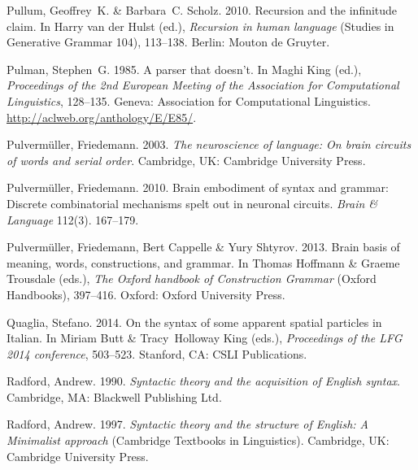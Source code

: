 \begin{thebibliography}{1420}
Pullum, Geoffrey~K. \& Barbara~C. Scholz. 2010.
\newblock Recursion and the infinitude claim.
\newblock In Harry {van der Hulst} (ed.), \emph{Recursion in human language}
  (Studies in Generative Grammar 104), 113--138. Berlin: Mouton de Gruyter.

Pulman, Stephen~G. 1985.
\newblock A parser that doesn't.
\newblock In Maghi King (ed.), \emph{Proceedings of the 2nd {European Meeting
  of the Association for Computational Linguistics}}, 128--135. Geneva:
  Association for Computational Linguistics.
\newblock \urlprefix\url{http://aclweb.org/anthology/E/E85/}.

Pulverm{\"u}ller, Friedemann. 2003.
\newblock \emph{The neuroscience of language: {On} brain circuits of words and
  serial order}.
\newblock Cambridge, UK: Cambridge University Press.

Pulverm{\"u}ller, Friedemann. 2010.
\newblock Brain embodiment of syntax and grammar: Discrete combinatorial
  mechanisms spelt out in neuronal circuits.
\newblock \emph{Brain \& Language} 112(3). 167--179.

Pulverm{\"u}ller, Friedemann, Bert Cappelle \& Yury Shtyrov. 2013.
\newblock Brain basis of meaning, words, constructions, and grammar.
\newblock In Thomas Hoffmann \& Graeme Trousdale (eds.), \emph{The {Oxford}
  handbook of {Construction Grammar}}  (Oxford Handbooks), 397--416. Oxford:
  Oxford University Press.

Quaglia, Stefano. 2014.
\newblock On the syntax of some apparent spatial particles in {Italian}.
\newblock In Miriam Butt \& Tracy~Holloway King (eds.), \emph{Proceedings of
  the {LFG 2014} conference}, 503--523. Stanford, CA: CSLI Publications.

Radford, Andrew. 1990.
\newblock \emph{Syntactic theory and the acquisition of {English} syntax}.
\newblock Cambridge, MA: Blackwell Publishing Ltd.

Radford, Andrew. 1997.
\newblock \emph{Syntactic theory and the structure of {English}: {A}
  {Minimalist} approach}  (Cambridge Textbooks in Linguistics).
\newblock Cambridge, UK: Cambridge University Press.


\end{thebibliography}
